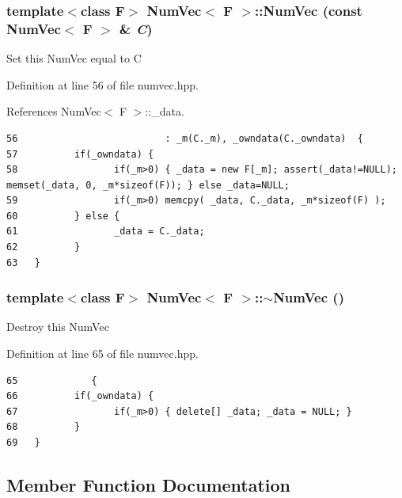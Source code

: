\subsubsection{\setlength{\rightskip}{0pt plus 5cm}template$<$class F$>$ {\bf Num\-Vec}$<$ F $>$::{\bf Num\-Vec} (const {\bf Num\-Vec}$<$ F $>$ \& {\em C})\hspace{0.3cm}{\tt  [inline]}}\label{classNumVec_94ce68c632f9ac6143e4ea61d0166839_94ce68c632f9ac6143e4ea61d0166839}


Set this Num\-Vec equal to C 

Definition at line 56 of file numvec.hpp.

References Num\-Vec$<$ F $>$::\_\-data.

\footnotesize\begin{verbatim}56                          : _m(C._m), _owndata(C._owndata)  {
57          if(_owndata) {
58                 if(_m>0) { _data = new F[_m]; assert(_data!=NULL); memset(_data, 0, _m*sizeof(F)); } else _data=NULL;
59                 if(_m>0) memcpy( _data, C._data, _m*sizeof(F) );
60          } else {
61                 _data = C._data;
62          }
63   }
\end{verbatim}\normalsize 


\subsubsection{\setlength{\rightskip}{0pt plus 5cm}template$<$class F$>$ {\bf Num\-Vec}$<$ F $>$::$\sim${\bf Num\-Vec} ()\hspace{0.3cm}{\tt  [inline]}}\label{classNumVec_73bf8d147cb5055cde71aa1b0a136dc6_73bf8d147cb5055cde71aa1b0a136dc6}


Destroy this Num\-Vec 

Definition at line 65 of file numvec.hpp.

\footnotesize\begin{verbatim}65             {
66          if(_owndata) {
67                 if(_m>0) { delete[] _data; _data = NULL; }
68          }
69   }
\end{verbatim}\normalsize 




\subsection{Member Function Documentation}
